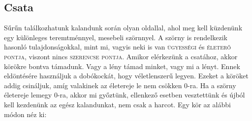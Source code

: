 \documentclass[12pt,a4paper,oneside]{report}
\newcommand{\stat}{\textsc}
\begin{document}
      \subsection{Csata}
        Sűrűn találkozhatunk kalandunk során olyan oldallal, ahol meg
        kell küzdenünk egy különleges teremtménnyel, mesebeli
        szörnnyel. A szörny is rendelkezik hasonló tulajdonságokkal,
        mint mi, vagyis neki is van \stat{ügyességi} és \stat{életerő
        pontja}, viszont nincs \stat{szerencse pontja}.  Amikor
        elérkezünk a csatához, akkor körökre bontva támadunk. Vagy a
        lény támad minket, vagy mi a lényt. Ennek eldöntésére
        használjuk a dobókockát, hogy véletlenszerű legyen. Ezeket a
        köröket addig csináljuk, amíg valakinek az életereje le nem
        csökken 0-ra. Ha a szörny életereje lemegy 0-ra, akkor mi
        győztünk, ellenkező esetben vesztettünk és újból kell
        kezdenünk az egész kalandunkat, nem csak a harcot. Egy kör az
        alábbi módon néz ki:
\end{document}
